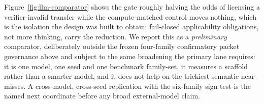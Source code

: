 Figure~\ref{fig:llm-comparator} shows the gate roughly halving the odds of licensing a verifier-invalid transfer while the compute-matched control moves nothing, which is the isolation the design was built to obtain: fail-closed applicability obligations, not more thinking, carry the reduction. We report this as a \emph{preliminary} comparator, deliberately outside the frozen four-family confirmatory packet governance above and subject to the same broadening the primary lane requires: it is one model, one seed and one benchmark family-set, it measures a scaffold rather than a smarter model, and it does not help on the trickiest semantic near-misses. A cross-model, cross-seed replication with the six-family sign test is the named next coordinate before any broad external-model claim.
